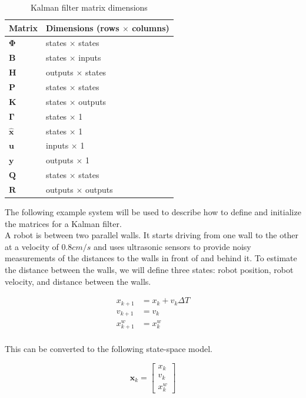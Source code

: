 \documentclass[10pt,conference,compsoc]{IEEEtran}
\newcommand{\mtx}[1] {\bm #1}
\begin{document}
\begin{table}[ht]
  \caption{Kalman filter matrix dimensions}
  \renewcommand{\arraystretch}{1.5}
  \centering
  \begin{tabular}{|ll|}
    \hline
    \textbf{Matrix} & \textbf{Dimensions (rows $\times$ columns)} \\
    \hline
    $\mtx{\Phi}$ & states $\times$ states \\
    $\mtx{B}$ & states $\times$ inputs \\
    $\mtx{H}$ & outputs $\times$ states \\
    $\mtx{P}$ & states $\times$ states \\
    $\mtx{K}$ & states $\times$ outputs \\
    $\mtx{\Gamma}$ & states $\times$ 1 \\
    $\mtx{\hat{x}}$ & states $\times$ 1 \\
    $\mtx{u}$ & inputs $\times$ 1 \\
    $\mtx{y}$ & outputs $\times$ 1 \\
    $\mtx{Q}$ & states $\times$ states \\
    $\mtx{R}$ & outputs $\times$ outputs \\
    \hline
  \end{tabular}
  \label{tab:kf_matrix_dims}
\end{table}

\noindent The following example system will be used to describe how to define
and initialize the matrices for a Kalman filter. \\

\noindent A robot is between two parallel walls. It starts driving from one wall
to the other at a velocity of $0.8 cm/s$ and uses ultrasonic sensors to provide
noisy measurements of the distances to the walls in front of and behind it. To
estimate the distance between the walls, we will define three states: robot
position, robot velocity, and distance between the walls.

\begin{align}
  x_{k+1} &= x_k + v_k \Delta T \\
  v_{k+1} &= v_k \\
  x_{k+1}^w &= x_k^w
\end{align}
\\
\noindent This can be converted to the following state-space model.

\begin{equation}
  \mtx{x}_k = \left[
  \begin{array}{c}
    x_k \\
    v_k \\
    x_k^w
  \end{array} \right]
\end{equation}
\end{document}
